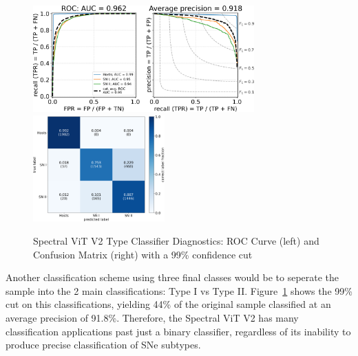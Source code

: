 \begin{figure}[hb!]
    \centering
    \includegraphics[height=4.1cm]{figures/v2_applications/vit_model_V2roc99_type_e26.png}
    \quad
    \includegraphics[height=4.1cm]{figures/v2_applications/vit_model_V2cm99_type_e26.png}
    \caption[Spectral ViT V2 Type Classifier Diagnostics]{Spectral ViT V2 
    Type Classifier Diagnostics: ROC Curve (left) and Confusion Matrix (right) with a 99\% confidence
    cut\label{fig:v2_99_type_qual}}
\end{figure}
Another classification scheme using three final classes would be to seperate the sample into the 2 main 
classifications: Type I vs Type II. Figure~\ref{fig:v2_99_type_qual} shows the 99\% cut on this classifications, 
yielding 44\% of the original sample classified at an average precision of 91.8\%. Therefore, the Spectral ViT V2
has many classification applications past just a binary classifier, regardless of its inability to produce precise 
classification of SNe subtypes.




